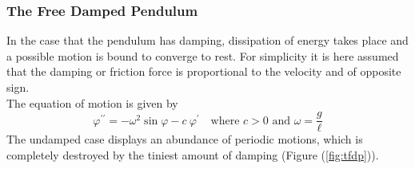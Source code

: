 \subsubsection{The Free Damped Pendulum}
In the case that the pendulum has damping, dissipation of energy takes place and a possible motion is bound to converge to rest.
For simplicity it is here assumed that the damping or friction force is proportional to the velocity and of opposite sign.\\
The equation of motion is given by
\begin{equation}
	\varphi^{\prime\prime}=-\omega^2\sin\varphi-c\ \varphi^\prime\quad\text{where $c>0$ and $\omega=\frac{g}{\ell}$}
\end{equation}
The undamped case displays an abundance of periodic motions, which is completely destroyed by the tiniest amount of damping (Figure (\ref{fig:tfdp})).